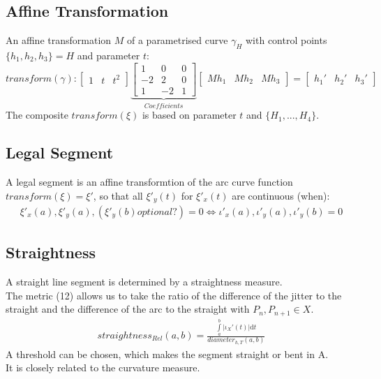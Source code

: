 \documentclass{report}
\begin{document}
\subsection{Affine Transformation}
An affine transformation $M$ of a parametrised curve $\gamma_{H}$ with control points $\{h_{1},h_{2},h_{3}\} = H$ and parameter $t$:
\begin{equation}
transform(\gamma):
\begin{bmatrix}
1 & t & t^2
\end{bmatrix}
\underbrace{\begin{bmatrix}
1 & 0 & 0\\
-2 & 2 & 0\\
1 & -2 &1
\end{bmatrix}}_{Coefficients}
\begin{bmatrix}
Mh_{1} & Mh_{2} & Mh_{3}
\end{bmatrix}
=
\begin{bmatrix}
h_{1}' & h_{2}' & h_{3}'
\end{bmatrix}
\end{equation}
The composite $transform(\xi)$ is based on parameter $t$ and $\{H_{1}, ... ,H_{4}\}$.

\subsection{Legal Segment}
A legal segment is an affine transformtion of the arc curve function $transform(\xi) = \xi'$, so that all $\xi'_{y}(t)$ for $\xi'_{x}(t)$ are continuous (when):
\begin{align}
\xi'_{x}(a),\xi'_{y}(a), (\xi'_{y}(b)optional?) = 0 \Leftrightarrow \iota'_{x}(a),\iota'_{y}(a), \iota'_{y}(b) = 0
\end{align}

\subsection{Straightness}
A straight line segment is determined by a straightness measure.\\
The metric (12) allows us to take the ratio of the difference of the jitter to the straight and the difference of the arc to the straight with $P_{n},P_{n+1} \in X$. \\
\begin{align}
straightness_{Rel}(a,b)=\frac{\int \limits _{a}^{b} \lvert \iota_{X}'(t) \rvert \mathrm{d}t}{diameter_{h,T}(a,b)}
\end{align}
A threshold can be chosen, which makes the segment straight or bent in A.\\
It is closely related to the curvature measure.
\end{document}
